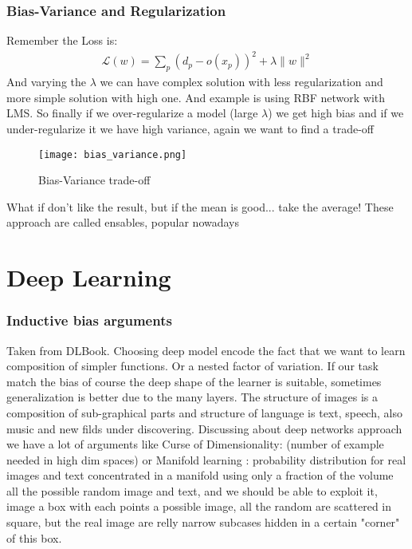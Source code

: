 \documentclass[12pt]{book}
\begin{document}
\subsection{Bias-Variance and Regularization}
Remember the Loss is:
\begin{equation}
	\begin{align}
	\mathcal{L}(w) = \sum_{p} (d_p - o(x_p))^2 + \lambda \|w\|^2
	\end{align}
\end{equation}
And varying the $\lambda$ we can have complex solution with less regularization and more simple solution with high one. And example is using RBF network with LMS.\newline
So finally if we over-regularize a model (large $\lambda$) we get high bias and if we under-regularize it we have high variance, again we want to find a trade-off

\begin{figure}[h]
	\centering
	\texttt{[image: bias\_variance.png]}
	\caption{Bias-Variance trade-off}
	\label{fig:bias_variance}
\end{figure}

What if don't like the result, but if the mean is good... take the average! These approach are called ensables, popular nowadays
\clearpage 
\chapter{Deep Learning}
\subsection{Inductive bias arguments}
Taken from DLBook.\newline
Choosing deep model encode the fact that we want to learn composition of simpler functions. Or a nested factor of variation. If our task match the bias of course the deep shape of the learner is suitable, sometimes generalization is better due to the many layers. The structure of images is a composition of sub-graphical parts and structure of language is text, speech, also music and new filds under discovering.\newline
Discussing about deep networks approach we have a lot of arguments like Curse of Dimensionality: (number of example needed in high dim spaces) or Manifold learning : probability distribution for real images and text concentrated in a manifold using only a fraction of the volume all the possible random image and text, and we should be able to exploit it, image a box with each points a possible image, all the random are scattered in square, but the real image are relly narrow subcases hidden in a certain "corner" of this box.
\end{document}
